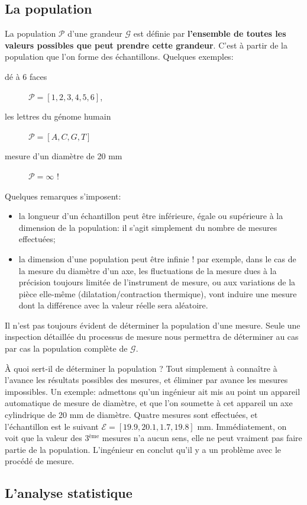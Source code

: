 \subsection{La population}

La population $\mathcal{P}$ d'une grandeur $\mathcal{G}$ est définie par \textbf{l'ensemble de toutes les valeurs possibles que peut prendre cette grandeur}. C'est à partir de la population que l'on forme des échantillons. Quelques exemples:
\begin{description}
\item[dé à 6 faces] $\mathcal{P}=[1,2,3,4,5,6]$,
\item[les lettres du génome humain] $\mathcal{P}=[A,C,G,T]$
\item[mesure d'un diamètre de 20 mm] $\mathcal{P}=\infty$ !
\end{description}
Quelques remarques s'imposent:
\begin{itemize}
\item la longueur d'un échantillon peut être inférieure, égale ou supérieure à la dimension de la population: il s'agit simplement du nombre de mesures effectuées;
\item la dimension d'une population peut être infinie ! par exemple, dans le cas de la mesure du diamètre d'un axe, les fluctuations de la mesure dues à la précision toujours limitée de l'instrument de mesure, ou aux variations de la pièce elle-même (dilatation/contraction thermique), vont induire une mesure dont la différence avec la valeur réelle sera aléatoire.
\end{itemize}
Il n'est pas toujours évident de déterminer la population d'une mesure. Seule une inspection détaillée du processus de mesure nous permettra de déterminer au cas par cas la population complète de $\mathcal{G}$.

À quoi sert-il de déterminer la population ? Tout simplement à connaître à l'avance les résultats possibles des mesures, et éliminer par avance les mesures impossibles. Un exemple: admettons qu'un ingénieur ait mis au point un appareil automatique de mesure de diamètre, et que l'on soumette à cet appareil un axe cylindrique de 20 mm de diamètre. Quatre mesures sont effectuées, et l'échantillon est le suivant $\mathcal{E}=[19.9,20.1,1.7,19.8]$ mm. Immédiatement, on voit que la valeur des 3$^\text{ème}$ mesures n'a aucun sens, elle ne peut vraiment pas faire partie de la population. L'ingénieur en conclut qu'il y a un problème avec le procédé de mesure.

\subsection{L'analyse statistique}

